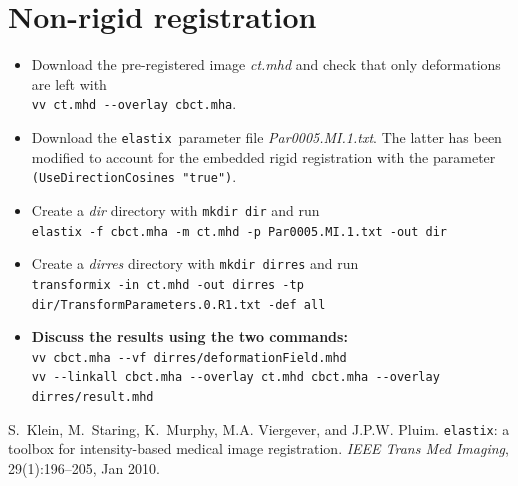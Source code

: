 \documentclass[]{report}
\newcommand{\elastix}{\texttt{elastix}}
\begin{document}

\section{Non-rigid registration}

\begin{itemize}
 \item Download the pre-registered image \textit{ct.mhd} and check that
     only deformations are left with\\\verb+vv ct.mhd --overlay cbct.mha+.
 \item Download the \elastix\ parameter file \textit{Par0005.MI.1.txt}. The
     latter has been modified to account for the embedded rigid
     registration with the parameter\\\verb+(UseDirectionCosines "true")+.
 \item Create a \textit{dir} directory with \verb+mkdir dir+ and
     run\\\verb+elastix -f cbct.mha -m ct.mhd -p Par0005.MI.1.txt -out dir+
 \item Create a \textit{dirres} directory with \verb+mkdir dirres+ and
     run\\\verb+transformix -in ct.mhd -out dirres -tp dir/TransformParameters.0.R1.txt -def all+ %
 \item \textbf{Discuss the results using the two commands:}\\
 \verb+vv cbct.mha --vf dirres/deformationField.mhd+\\
 \verb+vv --linkall cbct.mha --overlay ct.mhd cbct.mha --overlay dirres/result.mhd+ %

\end{itemize}

\noindent[1] S.~Klein, M.~Staring, K.~Murphy, M.A. Viergever, and
J.P.W. Pluim. \elastix: a toolbox for intensity-based medical image
registration. {\em IEEE Trans Med Imaging}, 29(1):196--205, Jan
2010.
\end{document}
